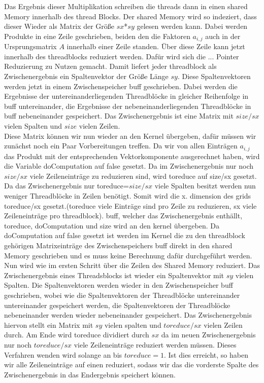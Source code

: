 \documentclass[10pt,a4paper]{article}
\begin{document}
	 Das Ergebnis dieser Multiplikation schreiben die threads dann in einen shared Memory innerhalb des thread Blocks. Der shared Memory wird so indeziert, dass dieser Wieder als Matrix der Größe $sx$*$sy$ gelesen werden kann. Dabei werden Produkte in eine Zeile geschrieben, beiden den die Faktoren $a_{i,j}$ auch in der Ursprungsmatrix $A$ innerhalb einer Zeile standen. Über diese Zeile kann jetzt innerhalb des threadblocks reduziert werden. Dafür wird sich die ... Pointer Reduzierung zu Nutzen gemacht. Damit liefert jeder threadblock als Zwischenergebnis ein Spaltenvektor der Größe Länge $sy$. Diese Spaltenvektoren werden jetzt in einem Zwischenspeicher buff geschrieben. Dabei werden die Ergebnisse der untereinanderliegenden Threadblöcke in gleicher Reihenfolge in buff untereinander, die Ergebnisse der nebeneinanderliegenden Threadblöcke in buff nebeneinander gespeichert. Das Zwischenergebnis ist eine Matrix mit $size/sx$ vielen Spalten und $size$	vielen Zeilen. \\
	 Diese Matrix können wir nun wieder an den Kernel übergeben, dafür müssen wir zunächst noch ein Paar Vorbereitungen treffen. Da wir von allen Einträgen $a_{i,j}$ das Produkt mit der entsprechenden Vektorkomponente ausgerechnet haben, wird die Variable doComputation auf false gesetzt. Da im Zwischenergebnis nur noch $size/sx$ viele Zeileneinträge zu reduzieren sind, wird toreduce auf size/sx gesetzt. Da das Zwischenergebnis nur toreduce=$size/sx$ viele Spalten besitzt werden nun weniger Threadblöcke in Zeilen benötigt. Somit wird die x. dimension des grids toreduce/sx gesetzt.(toreduce viele Einträge sind pro Zeile zu reduzieren, sx viele Zeileneinträge pro threadblock). buff, welcher das Zwischenergebnis enthällt, toreduce, doComputation und size wird an den kernel übergeben. Da doComputation auf false gesetzt ist werden im Kernel die zu den threadblock gehörigen Matrixeinträge des Zwischenspeichers buff direkt in den shared Memory geschrieben und es muss keine Berechnung dafür durchgeführt werden. Nun wird wie im ersten Schritt über die Zeilen des Shared Memory reduziert. Das Zwischenergebnis eines Threadsblocks ist wieder ein Spaltenvektor mit $sy$ vielen Spalten. Die Spaltenvektoren werden wieder in den Zwischenspeicher buff geschrieben, wobei wie die Spaltenvektoren der Threadblöcke untereinander untereinander gespeichert werden, die Spaltenvektoren der Threadblöcke nebeneinander werden wieder nebeneinander gespeichert. 
	 Das Zwischenergebnis hiervon stellt ein Matrix mit $sy$ vielen spalten und $toreduce/sx$ vielen Zeilen durch.
	 Am Ende wird toreduce dividiert durch $sx$ da im neuen Zwischenergebnis nur noch $toreduce/sx$ viele Zeileneinträge reduziert werden müssen. Dieses Verfahren wenden wird solange an bis $toreduce=1$. Ist dies erreicht, so haben wir alle Zeileneinträge auf einen reduziert, sodass wir das die vorderste Spalte des Zwischenergebnis in das Endergebnis speichert können.
\end{document}
